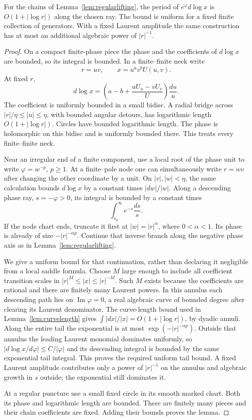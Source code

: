 \begin{lemma}
\label{lem:logpieces}
For the chains of Lemma~\ref{lem:regularlifting}, the period of
$e^{\varphi}d\log x$ is $O(1+|\log r|)$ along the chosen ray.
The bound is uniform for a fixed finite collection of generators.
With a fixed Laurent amplitude the same construction has at most
an additional algebraic power of $|r|^{-1}$.
\end{lemma}
\begin{proof}
On a compact finite-phase piece the phase and the coefficients of
$d\log x$ are bounded, so its integral is bounded. In a finite--finite
neck write
\[
 r=uv,\qquad x=u^a v^b U(u,v).
\]
At fixed $r$,
\[
 d\log x=\left(a-b+\frac{uU_u-vU_v}{U}\right)\frac{du}{u}.
\]
The coefficient is uniformly bounded in a small bidisc. A radial
bridge across $|r|/\eta\leq|u|\leq\eta$, with bounded angular
detours, has logarithmic length $O(1+|\log r|)$. Circles have bounded
logarithmic length. The phase is holomorphic on this bidisc and is
uniformly bounded there. This treats every finite--finite neck.

Near an irregular end of a finite component, use a local root of
the phase unit to write $\varphi=w^{-p}$, $p\geq1$. At a
finite--pole node one can simultaneously write $r=wv$ after changing
the other coordinate by a unit. On $|v|,|w|<\eta$, the same
calculation bounds $d\log x$ by a constant times $|dw|/|w|$.
Along a descending phase ray, $s=-\varphi>0$, its integral is bounded
by a constant times
\[
 \int_{s_0}^{\infty}e^{-s}\frac{ds}{s}.
\]
If the node chart ends, truncate it first at $|w|=|r|^\alpha$,
where $0<\alpha<1$. Its phase is already of size
$-|r|^{-\alpha p}$. Continue that inverse branch along the negative
phase axis as in Lemma~\ref{lem:regularlifting}.

We give a uniform bound for that continuation, rather than declaring
it negligible from a local saddle formula. Choose $M$ large enough
to include all coefficient transition scales in
$|r|^M\leq|x|\leq|r|^{-M}$. Such $M$ exists because the coefficients
are rational and there are finitely many Laurent powers. In this
annulus each descending path lies on $\operatorname{Im}\varphi=0$,
a real algebraic curve of bounded degree after clearing its Laurent
denominator. The curve-length bound used in
Lemma~\ref{lem:curvelength} gives
$\int|dx|/|x|=O(1+|\log r|)$, by dyadic annuli. Along the entire
tail the exponential is at most
$\exp(-|r|^{-\alpha p})$. Outside that annulus the leading Laurent
monomial dominates uniformly, so
$|d\log x/d\varphi|\leq C/|\varphi|$ and its descending integral
is bounded by the same exponential tail integral. This proves the
required uniform tail bound. A fixed Laurent amplitude contributes
only a power of $|r|^{-1}$ on the annulus and algebraic growth in
$s$ outside; the exponential still dominates it.

At a regular puncture use a small fixed circle in its smooth marked
chart. Both its phase and logarithmic length are bounded. There are
finitely many pieces and their chain coefficients are fixed.
Adding their bounds proves the lemma.
\end{proof}

